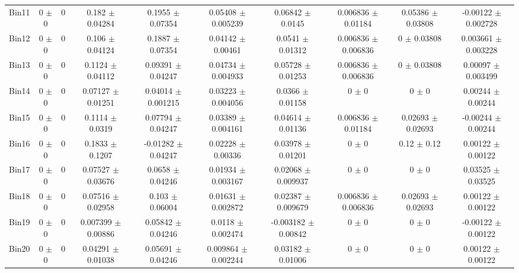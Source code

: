 \begin{tabular}{@{\extracolsep{4pt}}lccccccccc@{}}
     Bin11 & 0 $\pm$ 0 & 0 & 0.182 $\pm$ 0.04284 & 0.1955 $\pm$ 0.07354 & 0.05408 $\pm$ 0.005239 & 0.06842 $\pm$ 0.0145 & 0.006836 $\pm$ 0.01184 & 0.05386 $\pm$ 0.03808 & -0.00122 $\pm$ 0.002728 \\ 
     Bin12 & 0 $\pm$ 0 & 0 & 0.106 $\pm$ 0.04124 & 0.1887 $\pm$ 0.07354 & 0.04142 $\pm$ 0.00461 & 0.0541 $\pm$ 0.01312 & 0.006836 $\pm$ 0.006836 & 0 $\pm$ 0.03808 & 0.003661 $\pm$ 0.003228 \\ 
     Bin13 & 0 $\pm$ 0 & 0 & 0.1124 $\pm$ 0.04112 & 0.09391 $\pm$ 0.04247 & 0.04734 $\pm$ 0.004933 & 0.05728 $\pm$ 0.01253 & 0.006836 $\pm$ 0.006836 & 0 $\pm$ 0.03808 & 0.00097 $\pm$ 0.003499 \\ 
     Bin14 & 0 $\pm$ 0 & 0 & 0.07127 $\pm$ 0.01251 & 0.04014 $\pm$ 0.001215 & 0.03223 $\pm$ 0.004056 & 0.0366 $\pm$ 0.01158 & 0 $\pm$ 0 & 0 $\pm$ 0 & 0.00244 $\pm$ 0.00244 \\ 
     Bin15 & 0 $\pm$ 0 & 0 & 0.1114 $\pm$ 0.0319 & 0.07794 $\pm$ 0.04247 & 0.03389 $\pm$ 0.004161 & 0.04614 $\pm$ 0.01136 & 0.006836 $\pm$ 0.01184 & 0.02693 $\pm$ 0.02693 & -0.00244 $\pm$ 0.00244 \\ 
     Bin16 & 0 $\pm$ 0 & 0 & 0.1833 $\pm$ 0.1207 & -0.01282 $\pm$ 0.04247 & 0.02228 $\pm$ 0.00336 & 0.03978 $\pm$ 0.01201 & 0 $\pm$ 0 & 0.12 $\pm$ 0.12 & 0.00122 $\pm$ 0.00122 \\ 
     Bin17 & 0 $\pm$ 0 & 0 & 0.07527 $\pm$ 0.03676 & 0.0658 $\pm$ 0.04246 & 0.01934 $\pm$ 0.003167 & 0.02068 $\pm$ 0.009937 & 0 $\pm$ 0 & 0 $\pm$ 0 & 0.03525 $\pm$ 0.03525 \\ 
     Bin18 & 0 $\pm$ 0 & 0 & 0.07516 $\pm$ 0.02958 & 0.103 $\pm$ 0.06004 & 0.01631 $\pm$ 0.002872 & 0.02387 $\pm$ 0.009679 & 0.006836 $\pm$ 0.006836 & 0.02693 $\pm$ 0.02693 & 0.00122 $\pm$ 0.00122 \\ 
     Bin19 & 0 $\pm$ 0 & 0 & 0.007399 $\pm$ 0.00886 & 0.05842 $\pm$ 0.04246 & 0.0118 $\pm$ 0.002474 & -0.003182 $\pm$ 0.00842 & 0 $\pm$ 0 & 0 $\pm$ 0 & -0.00122 $\pm$ 0.00122 \\ 
     Bin20 & 0 $\pm$ 0 & 0 & 0.04291 $\pm$ 0.01038 & 0.05691 $\pm$ 0.04246 & 0.009864 $\pm$ 0.002244 & 0.03182 $\pm$ 0.01006 & 0 $\pm$ 0 & 0 $\pm$ 0 & 0.00122 $\pm$ 0.00122 \\ 
\hline\hline
  \end{tabular}
